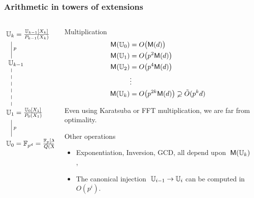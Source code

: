 \documentclass[10pt,usepdftitle=false]{beamer}
\begin{document}

\begin{frame}
  \frametitle{Arithmetic in towers of extensions}
  
  \begin{columns}
    \begin{column}{0.3\textwidth}
      \Large\[\xymatrix{
        *+[r]{\U_k = \frac{\U_{k-1}[X_k]}{P_{k-1}(X_k)}}\ar@{-}[d]^p\\
        *+[r]{\U_{k-1}} \ar@{--}[dd]\\
        \\
        *+[r]{\U_{1} = \frac{\U_0[X_1]}{P_0(X_1)}} \ar@{-}[d]^p\\
        *+[r]{\U_{0} = \F_{p^d} = \frac{\F_p[X_0]}{Q(X_0)}}
      }\]
    \end{column}
    \begin{column}{0.65\textwidth}
      \begin{block}{Multiplication}
        \vspace{-\baselineskip}
        \begin{align*}
          \mathsf{M}(\mathbb{U}_0) &= O\bigl(\mathsf{M}(d)\bigr)\\
          \mathsf{M}(\mathbb{U}_1) &= O\bigl(p^2\mathsf{M}(d)\bigr)\\
          \mathsf{M}(\mathbb{U}_2) &= O\bigl(p^4\mathsf{M}(d)\bigr)\\
          &\vdots\\
          \mathsf{M}(\mathbb{U}_k) &= O\bigl(p^{2k}\mathsf{M}(d)\bigr) \varsupsetneq \tilde{O}(p^kd)
        \end{align*}
        
        Even using Karatsuba or FFT multiplication, we are far from
        optimality.
      \end{block}
      \vspace{-1.5mm}
      \begin{block}{Other operations}
        \begin{itemize}
        \item Exponentiation, Inversion, GCD, all depend upon $\;\mathsf{M}(\mathbb{U}_k)$,
        \item The canonical injection $\;\mathbb{U}_{i-1}\rightarrow\mathbb{U}_i$ can be computed in $O(p^i)$.
        \end{itemize}
      \end{block}
    \end{column}
  \end{columns}
\end{frame}

\end{document}
